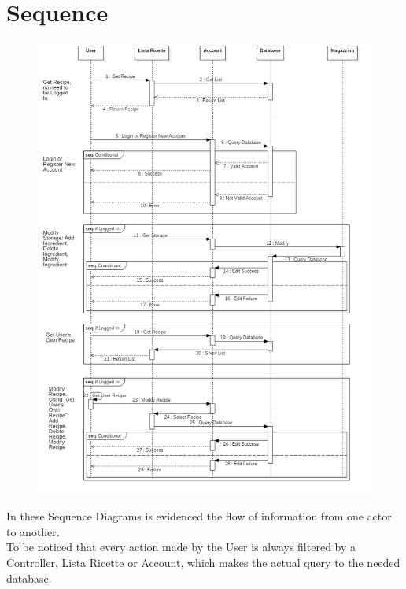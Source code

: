 \documentclass[12pt]{article}
\begin{document}
\section{Sequence}
\begin{figure}[H]
\includegraphics[scale=0.5]{SequenceDiagram1.png}
\centering
\end{figure}
\thispagestyle{empty}
\pagebreak
In these Sequence Diagrams is evidenced the flow of information from one actor to another.\\
To be noticed that every action made by the User is always filtered by a Controller, Lista Ricette or Account, which makes the actual query to the needed database.\\
\end{document}
